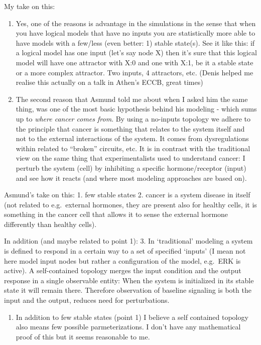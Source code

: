 \documentclass[
  12pt,
]{book}
\providecommand{\tightlist}{%
  \setlength{\itemsep}{0pt}\setlength{\parskip}{0pt}}
\begin{document}
My take on this:

\begin{enumerate}
\def\labelenumi{\arabic{enumi}.}
\tightlist
\item
  Yes, one of the reasons is advantage in the simulations in the sense that when you have logical models that have no inputs you are statistically more able to have models with a few/less (even better: 1) stable state(s).
  See it like this: if a logical model has one input (let's say node X) then it's sure that this logical model will have one attractor with X:0 and one with X:1, be it a stable state or a more complex attractor.
  Two inputs, 4 attractors, etc. (Denis helped me realise this actually on a talk in Athen's ECCB, great times)
\item
  The second reason that Asmund told me about when I asked him the same thing, was one of the most basic hypothesis behind his modeling - which sums up to \emph{where cancer comes from}.
  By using a no-inputs topology we adhere to the principle that cancer is something that relates to the system itself and not to the external interactions of the system.
  It comes from dysregulations within related to ``broken'' circuits, etc.
  It is in contrast with the traditional view on the same thing that experimentalists used to understand cancer: I perturb the system (cell) by inhibiting a specific hormone/receptor (input) and see how it reacts (and where most modeling approaches are based on).
\end{enumerate}

Asmund's take on this:
1. few stable states
2. cancer is a system disease in itself (not related to e.g.~external hormones, they are present also for healthy cells, it is something in the cancer cell that allows it to sense the external hormone differently than healthy cells).

In addition (and maybe related to point 1):
3. In `traditional' modeling a system is defined to respond in a certain way to a set of specified `inputs' (I mean not here model input nodes but rather a configuration of the model, e.g.~ERK is active).
A self-contained topology merges the input condition and the output response in a single observable entity: When the system is initialized in its stable state it will remain there.
Therefore observation of baseline signaling is both the input and the output, reduces need for perturbations.

\begin{enumerate}
\def\labelenumi{\arabic{enumi}.}
\setcounter{enumi}{3}
\tightlist
\item
  In addition to few stable states (point 1) I believe a self contained topology also means few possible parmeterizations.
  I don't have any mathematical proof of this but it seems reasonable to me.
\end{enumerate}
\end{document}
